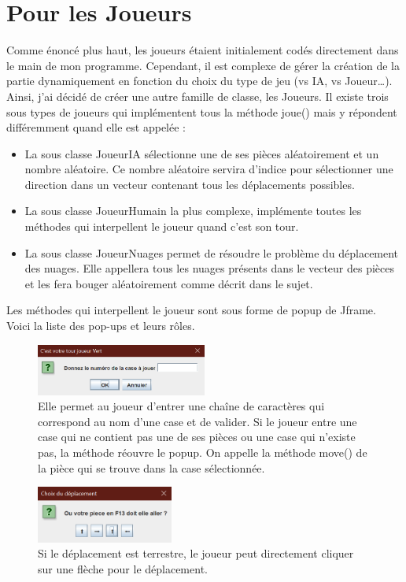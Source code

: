 \documentclass[titlepage]{report}
\begin{document}
\section{Pour les Joueurs}
Comme énoncé plus haut, les joueurs étaient initialement codés directement dans le main de mon programme. Cependant, il est complexe de gérer la création de la partie dynamiquement en fonction du choix du type de jeu (vs IA, vs Joueur…). Ainsi, j’ai décidé de créer une autre famille de classe, les Joueurs. Il existe trois sous types de joueurs qui implémentent tous la méthode joue() mais y répondent différemment quand elle est appelée :
\begin{itemize}[label=$\bullet$]
    \setlength\itemsep{1em}
    \item La sous classe JoueurIA sélectionne une de ses pièces aléatoirement et un nombre aléatoire. Ce nombre aléatoire servira d’indice pour sélectionner une direction dans un vecteur contenant tous les déplacements possibles.   
    \item La sous classe JoueurHumain la plus complexe, implémente toutes les méthodes qui interpellent le joueur quand c’est son tour.
    \item La sous classe JoueurNuages permet de résoudre le problème du déplacement des nuages. Elle appellera tous les nuages présents dans le vecteur des pièces et les fera bouger aléatoirement comme décrit dans le sujet. 
\end{itemize}
Les méthodes qui interpellent le joueur sont sous forme de popup de Jframe. Voici la liste des pop-ups et leurs rôles. 
\begin{figure}[h]
    \centering
    \includegraphics[width=0.5\textwidth]{img/votre_tour.PNG}
    \caption{Elle permet au joueur d’entrer une chaîne de caractères qui correspond au nom d’une case et de valider. Si le joueur entre une case qui ne contient pas une de ses pièces ou une case qui n’existe pas, la méthode réouvre le popup. On appelle la méthode move() de la pièce qui se trouve dans la case sélectionnée. }
\end{figure}

\begin{figure}[h]
    \centering
    \includegraphics[width=0.4\textwidth]{img/simple_move.PNG}
    \caption{Si le déplacement est terrestre, le joueur peut directement cliquer sur une flèche pour le déplacement.}
\end{figure}
\end{document}
